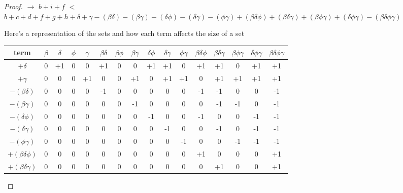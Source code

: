 \documentclass[manuscript]{acmart}
\begin{document}
\begin{proof}
        $\rightarrow$ $b + i + f$
        $<$
        $b + c + d + f + g + h 
         + \delta + \gamma
        - (\beta \delta) - (\beta \gamma) - (\delta \phi) - (\delta \gamma) - (\phi \gamma)
        + (\beta \delta \phi) + (\beta \delta \gamma) + (\beta \phi \gamma) + (\delta \phi \gamma)
        - (\beta \delta \phi \gamma) 
        $

        Here's a representation of the sets and how each term affects the size of a set

        \begin{center}
            \begin{tabular}{ |c|c|c|c|c|c|c|c|c|c|c|c|c|c|c|c| }
                \hline
                term & $\beta$ & $\delta$ & $\phi$ & $\gamma$ & 
                $\beta \delta$ & $\beta \phi$ & $\beta \gamma$ & 
                $\delta \phi$ & $\delta \gamma$ & $\phi \gamma$ &
                $\beta \delta \phi$ & $\beta \delta \gamma$ &
                $\beta \phi \gamma$ & $\delta \phi \gamma$ &
                $\beta \delta \phi \gamma$\\
                \hline
                $ + \delta$ & 0 & +1 & 0 & 0 & +1 & 0 & 0 & +1 & +1 & 0 & +1 & +1 & 0 & +1 & +1 \\
                \hline
                $ + \gamma$ & 0 & 0 & 0 & +1 & 0 & 0 & +1 & 0 & +1 & +1 & 0 & +1 & +1 & +1 & +1 \\
                \hline
                $- (\beta \delta)$ & 0 & 0 & 0 & 0 & -1 & 0 & 0 & 0 & 0 & 0 & -1 & -1 & 0 & 0 & -1 \\
                \hline
                $- (\beta \gamma)$ & 0 & 0 & 0 & 0 & 0 & 0 & -1 & 0 & 0 & 0 & 0 & -1 & -1 & 0 & -1 \\
                \hline
                $- (\delta \phi)$ & 0 & 0 & 0 & 0 & 0 & 0 & 0 & -1 & 0 & 0 & -1 & 0 & 0 & -1 & -1 \\
                \hline
                $- (\delta \gamma)$ & 0 & 0 & 0 & 0 & 0 & 0 & 0 & 0 & -1 & 0 & 0 & -1 & 0 & -1 & -1 \\
                \hline
                $- (\phi \gamma)$ & 0 & 0 & 0 & 0 & 0 & 0 & 0 & 0 & 0 & -1 & 0 & 0 & -1 & -1 & -1 \\
                \hline
                $+ (\beta \delta \phi)$ & 0 & 0 & 0 & 0 & 0 & 0 & 0 & 0 & 0 & 0 & +1 & 0 & 0 & 0 & +1 \\
                \hline
                $+ (\beta \delta \gamma)$ & 0 & 0 & 0 & 0 & 0 & 0 & 0 & 0 & 0 & 0 & 0 & +1 & 0 & 0 & +1 \\
                \hline

\end{tabular}
\end{center}
\end{proof}
\end{document}
